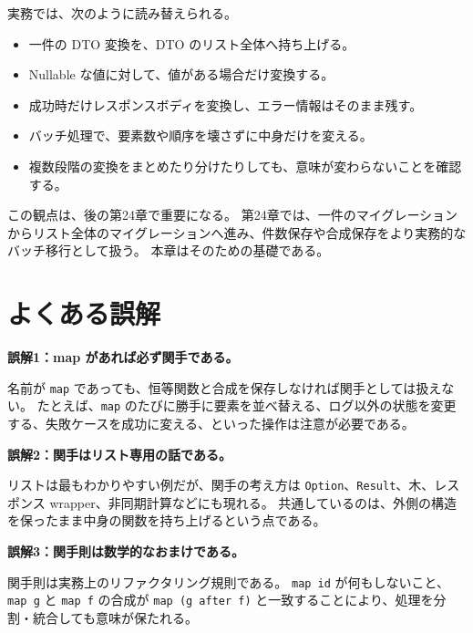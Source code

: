 \begin{softwarebox}
実務では、次のように読み替えられる。
\begin{itemize}
\item 一件の DTO 変換を、DTO のリスト全体へ持ち上げる。
\item Nullable な値に対して、値がある場合だけ変換する。
\item 成功時だけレスポンスボディを変換し、エラー情報はそのまま残す。
\item バッチ処理で、要素数や順序を壊さずに中身だけを変える。
\item 複数段階の変換をまとめたり分けたりしても、意味が変わらないことを確認する。
\end{itemize}
\end{softwarebox}

この観点は、後の第24章で重要になる。
第24章では、一件のマイグレーションからリスト全体のマイグレーションへ進み、件数保存や合成保存をより実務的なバッチ移行として扱う。
本章はそのための基礎である。

\section{よくある誤解}

\begin{warningbox}
\textbf{誤解1：map があれば必ず関手である。}

名前が \texttt{map} であっても、恒等関数と合成を保存しなければ関手としては扱えない。
たとえば、\texttt{map} のたびに勝手に要素を並べ替える、ログ以外の状態を変更する、失敗ケースを成功に変える、といった操作は注意が必要である。
\end{warningbox}

\begin{warningbox}
\textbf{誤解2：関手はリスト専用の話である。}

リストは最もわかりやすい例だが、関手の考え方は \texttt{Option}、\texttt{Result}、木、レスポンス wrapper、非同期計算などにも現れる。
共通しているのは、外側の構造を保ったまま中身の関数を持ち上げるという点である。
\end{warningbox}

\begin{warningbox}
\textbf{誤解3：関手則は数学的なおまけである。}

関手則は実務上のリファクタリング規則である。
\texttt{map id} が何もしないこと、\texttt{map g} と \texttt{map f} の合成が \texttt{map (g after f)} と一致することにより、処理を分割・統合しても意味が保たれる。
\end{warningbox}

